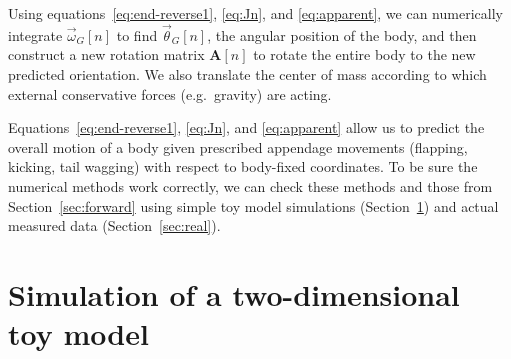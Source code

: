\documentclass{amsart}
\begin{document}
Using equations~\ref{eq:end-reverse1}, \ref{eq:Jn}, and \ref{eq:apparent}, we can numerically integrate $\vec\omega_G[n]$ to find $\vec\theta_G[n]$, the angular position of the body, and then construct a new rotation matrix $\mathbf{A}[n]$ to rotate the entire body to the new predicted orientation.  We also translate the center of mass according to which external conservative forces (e.g.\ gravity) are acting.

Equations~\ref{eq:end-reverse1}, \ref{eq:Jn}, and \ref{eq:apparent} allow us to predict the overall motion of a body given prescribed appendage movements (flapping, kicking, tail wagging) with respect to body-fixed coordinates.  To be sure the numerical methods work correctly, we can check these methods and those from Section~\ref{sec:forward} using simple toy model simulations (Section~\ref{sec:toy}) and actual measured data (Section~\ref{sec:real}). 

\section{Simulation of a two-dimensional toy model}
\label{sec:toy}
\end{document}
